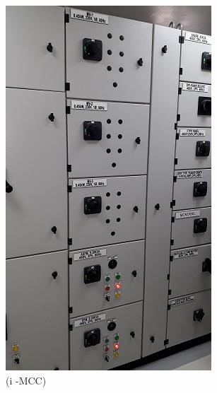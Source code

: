 \begin{figure}
\begin{minipage}[b]{0.22\linewidth}
	\includegraphics[width=\textwidth]{figures/R1P_visual/mcc}
	\caption*{(i -MCC)}
\end{minipage}
	\hspace{0.03cm}
\begin{minipage}[b]{0.22\linewidth}

\end{minipage}
\end{figure}

